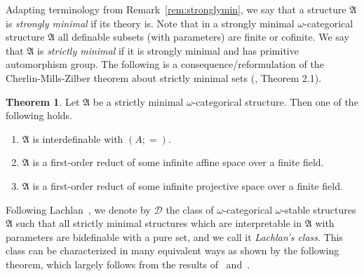 \documentclass{amsart}
\theoremstyle{definition}
\newtheorem{theorem}{Theorem}[section]
\theoremstyle{remark}
\numberwithin{equation}{section}
\newcommand{\fa}{\mathfrak{A}}
\begin{document}


Adapting terminology from Remark~\ref{rem:stronglymin}, we say that a structure $\fa$ is \emph{strongly minimal} if its theory is. Note that in a strongly minimal $\omega$-categorical structure $\fa$ all definable subsets (with parameters) are finite or cofinite. We say that $\fa$ is \emph{strictly minimal} if it is strongly minimal and has primitive automorphism group. 
The following is a consequence/reformulation of the Cherlin-Mills-Zilber theorem about strictly minimal sets (\cite{CherlinHarringtonLachlan}, Theorem 2.1).


\begin{theorem}\label{cml}
	Let $\fa$ be a strictly minimal $\omega$-categorical structure. Then one of the following holds.
\begin{enumerate}
\item $\fa$ is interdefinable with $(A;=)$. 
\item $\fa$ is a first-order reduct of some infinite affine space over a finite field.
\item $\fa$ is a first-order reduct of some infinite projective space over a finite field.
\end{enumerate}
\end{theorem}

Following
Lachlan~\cite{LachlanIndiscernible}, we denote by $\mathcal{D}$ the class of $\omega$-categorical $\omega$-stable structures $\fa$ such that all strictly minimal structures which are interpretable in $\fa$ with parameters are bidefinable with a pure set, and we call it \emph{Lachlan's class}. This class can be characterized in many equivalent ways as shown by the following theorem, which largely follows from the results of~\cite{LachlanIndiscernible} {and~\cite{macpherson1991interpreting}}.
\end{document}
